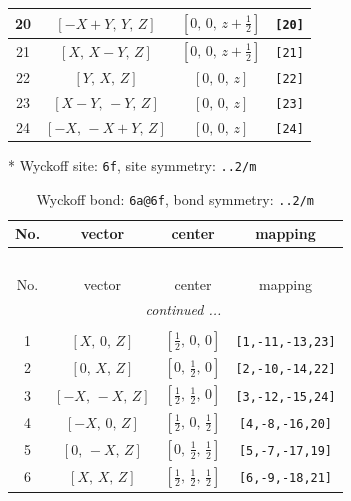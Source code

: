 \documentclass[fleqn,8pt]{jsarticle}
\begin{document}
\begin{longtable}{cccc}
20 & $\left[ - X + Y,\, Y,\, Z \right]$ & $\left[ 0,\, 0,\, z + \frac{1}{2} \right]$ & {\tt [20]} \\ \hline
21 & $\left[ X,\, X - Y,\, Z \right]$ & $\left[ 0,\, 0,\, z + \frac{1}{2} \right]$ & {\tt [21]} \\ \hline
22 & $\left[ Y,\, X,\, Z \right]$ & $\left[ 0,\, 0,\, z \right]$ & {\tt [22]} \\ \hline
23 & $\left[ X - Y,\, - Y,\, Z \right]$ & $\left[ 0,\, 0,\, z \right]$ & {\tt [23]} \\ \hline
24 & $\left[ - X,\, - X + Y,\, Z \right]$ & $\left[ 0,\, 0,\, z \right]$ & {\tt [24]} \\
\end{longtable}
* Wyckoff site: {\tt 6f}, site symmetry: {\tt ..2/m}
\renewcommand{\arraystretch}{1.2}
\begin{longtable}{cccc}
\caption{Wyckoff bond: {\tt 6a@6f}, bond symmetry: {\tt ..2/m}}
 \\
 \hline \hline
No. & vector & center & mapping \\ \hline \endfirsthead

\multicolumn{3}{l}{\tablename\ \thetable{}} \\
 \hline \hline
No. & vector & center & mapping \\ \hline \endhead

 \hline \hline
\multicolumn{3}{r}{\footnotesize\it continued ...} \\ \endfoot

 \hline \hline
\multicolumn{3}{r}{} \\ \endlastfoot

1 & $\left[ X,\, 0,\, Z \right]$ & $\left[ \frac{1}{2},\, 0,\, 0 \right]$ & {\tt [1,-11,-13,23]} \\ \hline
2 & $\left[ 0,\, X,\, Z \right]$ & $\left[ 0,\, \frac{1}{2},\, 0 \right]$ & {\tt [2,-10,-14,22]} \\ \hline
3 & $\left[ - X,\, - X,\, Z \right]$ & $\left[ \frac{1}{2},\, \frac{1}{2},\, 0 \right]$ & {\tt [3,-12,-15,24]} \\ \hline
4 & $\left[ - X,\, 0,\, Z \right]$ & $\left[ \frac{1}{2},\, 0,\, \frac{1}{2} \right]$ & {\tt [4,-8,-16,20]} \\ \hline
5 & $\left[ 0,\, - X,\, Z \right]$ & $\left[ 0,\, \frac{1}{2},\, \frac{1}{2} \right]$ & {\tt [5,-7,-17,19]} \\ \hline
6 & $\left[ X,\, X,\, Z \right]$ & $\left[ \frac{1}{2},\, \frac{1}{2},\, \frac{1}{2} \right]$ & {\tt [6,-9,-18,21]} \\
\end{longtable}
\end{document}
